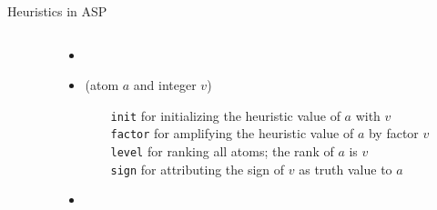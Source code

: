 \begin{block}{Heuristics in ASP}


\begin{columns} \begin{column}{.02\linewidth}\end{column}
\begin{column}{.98\linewidth}

\begin{itemize}

\item {} \ \alert{\hpredicate}

    \bigskip %

\item {} \hfill   (\alert{atom} $a$ and \alert{integer} $v$)

\ \ \ \ \alert{\texttt{init}} for initializing the heuristic value of $a$ with $v$
\\ \ \ \ \ \alert{\texttt{factor}} for amplifying the heuristic value of $a$ by factor $v$
\\ \ \ \ \ \alert{\texttt{level}} for ranking all atoms; the rank of $a$ is $v$
\\ \ \ \ \ \alert{\texttt{sign}} for attributing the sign of $v$ as truth value to $a$
  
    \bigskip %

\item {}






\end{itemize}
\end{column}
\end{columns}
\end{block}

